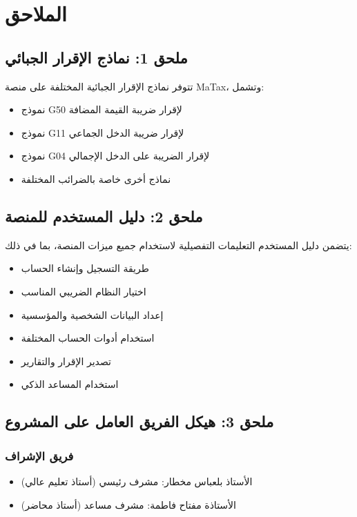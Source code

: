 \documentclass[12pt, a4paper, twoside]{report}
\begin{document}
\chapter*{الملاحق}

\section*{ملحق 1: نماذج الإقرار الجبائي}

تتوفر نماذج الإقرار الجبائية المختلفة على منصة MaTax، وتشمل:
\begin{itemize}
    \item نموذج G50 لإقرار ضريبة القيمة المضافة
    \item نموذج G11 لإقرار ضريبة الدخل الجماعي
    \item نموذج G04 لإقرار الضريبة على الدخل الإجمالي
    \item نماذج أخرى خاصة بالضرائب المختلفة
\end{itemize}

\section*{ملحق 2: دليل المستخدم للمنصة}

يتضمن دليل المستخدم التعليمات التفصيلية لاستخدام جميع ميزات المنصة، بما في ذلك:
\begin{itemize}
    \item طريقة التسجيل وإنشاء الحساب
    \item اختيار النظام الضريبي المناسب
    \item إعداد البيانات الشخصية والمؤسسية
    \item استخدام أدوات الحساب المختلفة
    \item تصدير الإقرار والتقارير
    \item استخدام المساعد الذكي
\end{itemize}

\section*{ملحق 3: هيكل الفريق العامل على المشروع}

\subsection*{فريق الإشراف}
\begin{itemize}
    \item الأستاذ بلعباس مخطار: مشرف رئيسي (أستاذ تعليم عالي)
    \item الأستاذة مفتاح فاطمة: مشرف مساعد (أستاذ محاضر)
\end{itemize}
\end{document}
